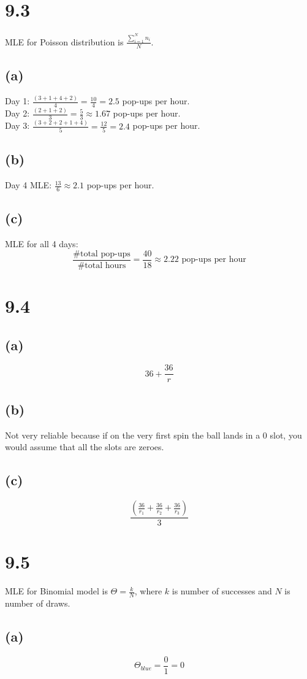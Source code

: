 \documentclass[11pt]{article}
\begin{document}
\section*{9.3}
MLE for Poisson distribution is $\frac{\sum_{i=1}^N{n_i}}{N}$.
\clearpage
\subsection*{(a)}
Day 1: $\frac{(3+1+4+2)}{4}=\frac{10}{4}=2.5$ pop-ups per hour. \\
Day 2: $\frac{(2+1+2)}{3}=\frac{5}{3}\approx 1.67$ pop-ups per hour. \\
Day 3: $\frac{(3+2+2+1+4)}{5}=\frac{12}{5}=2.4$ pop-ups per hour.
\subsection*{(b)}
Day 4 MLE: $\frac{13}{6}\approx2.1$ pop-ups per hour.
\subsection*{(c)}
MLE for all 4 days:
\[\frac{\text{\# total pop-ups}}{\text{\# total hours}}=\frac{40}{18}\approx2.22\text{ pop-ups per hour}\]
\section*{9.4}
\subsection*{(a)}
\[36+\frac{36}{r}\]
\subsection*{(b)}
Not very reliable because if on the very first spin the ball lands in a 0 slot, you would assume that all the slots are zeroes.
\subsection*{(c)}
\[\frac{\left(\frac{36}{r_1}+\frac{36}{r_2}+\frac{36}{r_3}\right)}{3}\]
\section*{9.5}
MLE for Binomial model is $\Theta=\frac{k}{N}$, where $k$ is number of successes and $N$ is number of draws.
\subsection*{(a)}
\[\Theta_{blue}=\frac{0}{1}=0\]
\end{document}
